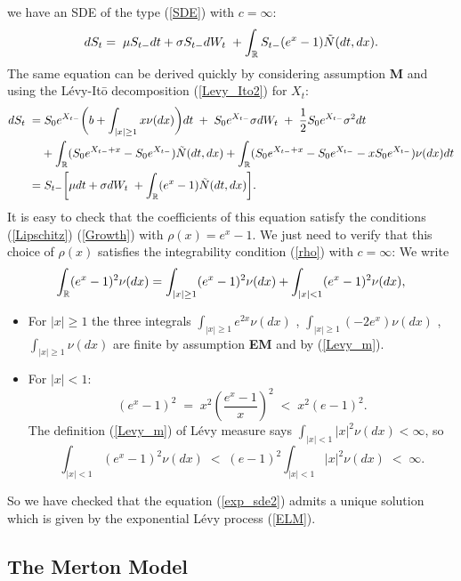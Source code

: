 we have an SDE of the type (\ref{SDE}) with $c=\infty$: 
\begin{equation}\label{exp_sde2}
 d S_t = \; \mu S_{t-} dt +  \sigma S_{t-} dW_t \; + \int_{\mathbb{R}} S_{t-} (e^{x} - 1) \tilde N(dt,dx). 
\end{equation}
The same equation can be derived quickly by considering assumption \textbf{M} and using the  
Lévy-It\={o} decomposition (\ref{Levy_Ito2}) for $X_t$:
\begin{align*}
 d S_t \; =& \; S_0 e^{X_{t-}} \biggl( b + \int_{|x|\geq 1}x \nu(dx) \biggr) dt \; + \; S_0 e^{X_{t-}} \sigma dW_t \; + \; \frac{1}{2}S_0 e^{X_{t-}}\sigma^2 dt \\ \nonumber
          &+ \int_{\mathbb{R}} (S_0 e^{X_{t-}+x} - S_0 e^{X_{t-}}) \tilde N(dt,dx) + \int_{\mathbb{R}} (S_0 e^{X_{t-}+x} - S_0 e^{X_{t-}} - x S_0 e^{X_{t-}}) \nu(dx) dt \\ \nonumber
          =& \; S_{t-} \biggl[ \mu dt +  \sigma dW_t \; + \int_{\mathbb{R}} (e^{x} - 1) \tilde N(dt,dx) \biggr].\\
\end{align*}
It is easy to check that the coefficients of this equation satisfy the conditions (\ref{Lipschitz})
(\ref{Growth}) with $\rho(x) = e^x-1$.
We just need to verify that this choice of $\rho(x)$ satisfies the integrability condition (\ref{rho}) with $c=\infty$:
We write $$ \int_{\mathbb{R}} (e^x-1)^2 \nu(dx) = \int_{|x|\geq1} (e^x-1)^2 \nu(dx) + \int_{|x| < 1} (e^x-1)^2 \nu(dx),$$
 \begin{itemize}
  \item For $|x|\geq 1$ the three integrals $\int_{|x|\geq1} e^{2x} \nu(dx)$ , $\int_{|x|\geq1} (-2e^x) \nu(dx)$ ,
  $\int_{|x|\geq1} \nu(dx)$ are finite by assumption \textbf{EM} and by (\ref{Levy_m}).
  \item For $|x| < 1$: 
  $$(e^x-1)^2 \; = \; x^2 \left(\frac{e^x-1}{x}\right)^2 \; < \; x^2 (e-1)^2. $$ 
The definition (\ref{Levy_m}) of Lévy measure says $ \int_{|x|<1} |x|^2 \nu(dx) < \infty $, so
$$ \int_{|x|<1} (e^x-1)^2 \nu(dx) \; < \; (e-1)^2 \int_{|x|<1} |x|^2 \nu(dx) \; < \; \infty. $$  
 \end{itemize}
So we have checked that the equation (\ref{exp_sde2}) admits a unique solution which is given by the exponential 
Lévy process (\ref{ELM}).

\subsection{The Merton Model}\label{Merton_section}

